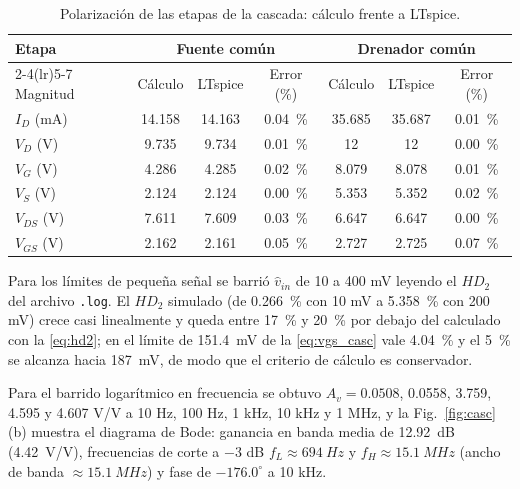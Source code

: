 \documentclass[conference]{IEEEtran}
\begin{document}
\begin{table}[htbp]
\centering
\caption{Polarización de las etapas de la cascada: cálculo frente a LTspice.}
\label{tab:casc}
\scriptsize
\renewcommand{\arraystretch}{1.03}
\setlength{\tabcolsep}{2.5pt}
\begin{tabular}{@{}lcccccc@{}}
\toprule
Etapa & \multicolumn{3}{c}{Fuente común} & \multicolumn{3}{c}{Drenador común} \\
\cmidrule(lr){2-4}\cmidrule(lr){5-7}
Magnitud & Cálculo & LTspice & Error (\%) & Cálculo & LTspice & Error (\%) \\
\midrule
$I_D$ (mA) & 14.158 & 14.163 & \SI{0.04}{\percent} & 35.685 & 35.687 & \SI{0.01}{\percent} \\
$V_D$ (V) & 9.735 & 9.734 & \SI{0.01}{\percent} & 12 & 12 & \SI{0.00}{\percent} \\
$V_G$ (V) & 4.286 & 4.285 & \SI{0.02}{\percent} & 8.079 & 8.078 & \SI{0.01}{\percent} \\
$V_S$ (V) & 2.124 & 2.124 & \SI{0.00}{\percent} & 5.353 & 5.352 & \SI{0.02}{\percent} \\
$V_{DS}$ (V) & 7.611 & 7.609 & \SI{0.03}{\percent} & 6.647 & 6.647 & \SI{0.00}{\percent} \\
$V_{GS}$ (V) & 2.162 & 2.161 & \SI{0.05}{\percent} & 2.727 & 2.725 & \SI{0.07}{\percent} \\
\bottomrule
\end{tabular}
\end{table}

Para los límites de pequeña señal se barrió $\hat v_{in}$ de 10 a 400 mV leyendo el $HD_2$ del archivo \texttt{.log}. El $HD_2$ simulado (de \SI{0.266}{\percent} con 10 mV a \SI{5.358}{\percent} con 200 mV) crece casi linealmente y queda entre \SI{17}{\percent} y \SI{20}{\percent} por debajo del calculado con la \eqref{eq:hd2}; en el límite de \SI{151.4}{mV} de la \eqref{eq:vgs_casc} vale \SI{4.04}{\percent} y el \SI{5}{\percent} se alcanza hacia \SI{187}{mV}, de modo que el criterio de cálculo es conservador.

Para el barrido logarítmico en frecuencia se obtuvo $A_v=0.0508$, 0.0558, 3.759, 4.595 y 4.607 V/V a 10 Hz, 100 Hz, 1 kHz, 10 kHz y 1 MHz, y la Fig.~\ref{fig:casc}(b) muestra el diagrama de Bode: ganancia en banda media de \SI{12.92}{dB} (\SI{4.42}{V/V}), frecuencias de corte a $-3$ dB $f_L\approx\SI{694}{Hz}$ y $f_H\approx\SI{15.1}{MHz}$ (ancho de banda $\approx\SI{15.1}{MHz}$) y fase de $-176.0^\circ$ a 10 kHz.
\end{document}
